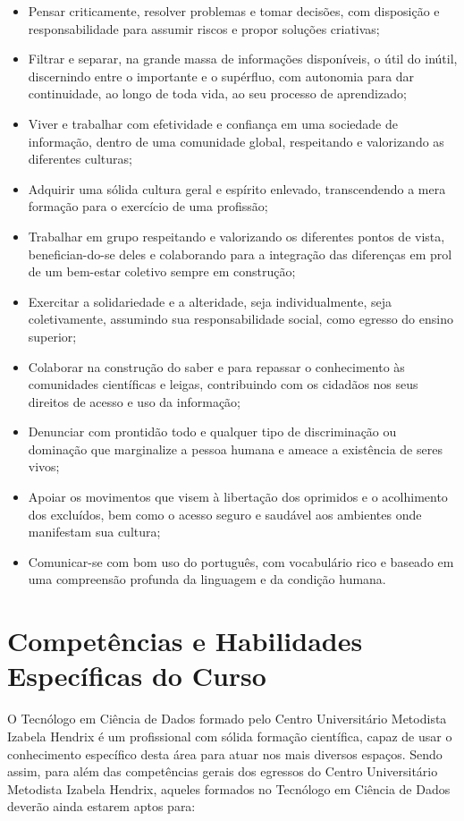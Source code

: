 \documentclass[a4paper, 12pt, openright, oneside, german, french, english, brazil]{abntex2}
\begin{document}
\begin{itemize}
\item Pensar criticamente, resolver problemas e tomar decisões, com disposição e responsabilidade para assumir riscos e propor soluções criativas;
\item Filtrar e separar, na grande massa de informações disponíveis, o útil do inútil, discernindo entre o importante e o supérfluo, com autonomia para dar continuidade, ao longo de toda vida, ao seu processo de aprendizado;
\item Viver e trabalhar com efetividade e confiança em uma sociedade de informação, dentro de uma comunidade global, respeitando e valorizando as diferentes culturas;
\item Adquirir uma sólida cultura geral e espírito enlevado, transcendendo a mera formação para o exercício de uma profissão;
\item Trabalhar em grupo respeitando e valorizando os diferentes pontos de vista, benefician-do-se deles e colaborando para a integração das diferenças em prol de um bem-estar coletivo sempre em construção;
\item Exercitar a solidariedade e a alteridade, seja individualmente, seja coletivamente, assumindo sua responsabilidade social, como egresso do ensino superior;
\item Colaborar na construção do saber e para repassar o conhecimento às comunidades científicas e leigas, contribuindo com os cidadãos nos seus direitos de acesso e uso da informação;
\item Denunciar com prontidão todo e qualquer tipo de discriminação ou dominação que marginalize a pessoa humana e ameace a existência de seres vivos;
\item Apoiar os movimentos que visem à libertação dos oprimidos e o acolhimento dos excluídos, bem como o acesso seguro e saudável aos ambientes onde manifestam sua cultura;
\item Comunicar-se com bom uso do português, com vocabulário rico e baseado em uma compreensão profunda da linguagem e da condição humana.
\end{itemize}

\section{Competências e Habilidades Específicas do Curso}

O Tecnólogo em Ciência de Dados formado pelo Centro Universitário Metodista Izabela Hendrix é um profissional com sólida formação científica, capaz de usar o conhecimento específico desta área para atuar nos mais diversos espaços. Sendo assim, para além das competências gerais dos egressos do Centro Universitário Metodista Izabela Hendrix, aqueles formados no Tecnólogo em Ciência de Dados deverão ainda estarem aptos para:
\end{document}
